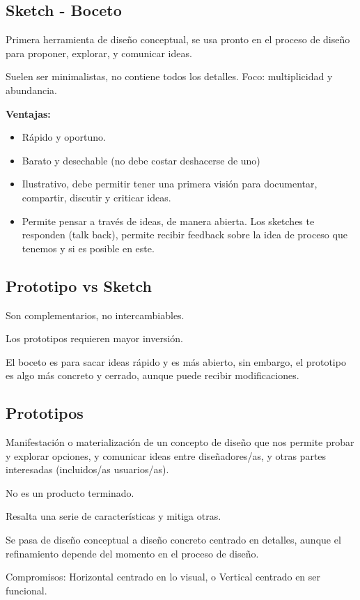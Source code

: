 \documentclass[12pt, twoside, openright]{report} %
\begin{document}
\subsection{Sketch - Boceto}
Primera herramienta de diseño conceptual, se usa pronto en el proceso de diseño para proponer, explorar, y comunicar ideas.

Suelen ser minimalistas, no contiene todos los detalles. Foco: multiplicidad y abundancia.

\textbf{Ventajas:}
\begin{itemize}
  \item Rápido y oportuno.
  \item Barato y desechable (no debe costar deshacerse de uno)
  \item Ilustrativo, debe permitir tener una primera visión para documentar, compartir, discutir y criticar ideas.
  \item Permite pensar a través de ideas, de manera abierta. Los sketches te responden (talk back), permite recibir feedback sobre la idea de proceso que tenemos y si es posible en este.
\end{itemize}

\subsection{Prototipo vs Sketch}
Son complementarios, no intercambiables.

Los prototipos requieren mayor inversión.

El boceto es para sacar ideas rápido y es más abierto, sin embargo, el prototipo es algo más concreto y cerrado, aunque puede recibir modificaciones.

\subsection{Prototipos}
Manifestación o materialización de un concepto de diseño que nos permite probar y explorar opciones, y comunicar ideas entre diseñadores/as, y otras partes interesadas (incluidos/as usuarios/as).

No es un producto terminado.

Resalta una serie de características y mitiga otras.

Se pasa de diseño conceptual a diseño concreto centrado en detalles, aunque el refinamiento depende del momento en el proceso de diseño.

Compromisos: Horizontal centrado en lo visual, o Vertical centrado en ser funcional.
\end{document}
